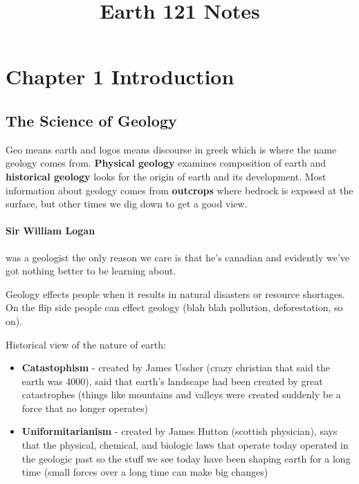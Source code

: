 \documentclass{article}
\title{Earth 121 Notes}
\author{}
\date{ }
\begin{document}
\maketitle

\tableofcontents


\section{Chapter 1 Introduction} %
\label{sec:chapter_1}
\subsection{The Science of Geology} %
\label{sub:the_science_of_geology}
Geo means earth and logos means discourse in greek which is where the name geology comes from. \textbf{Physical geology} examines composition of earth and \textbf{historical geology} looks for the origin of earth and its development. Most information about geology comes from \textbf{outcrops} where bedrock is exposed at the surface, but other times we dig down to get a good view.

\paragraph{Sir William Logan} was a geologist the only reason we care is that he's canadian and evidently we've got nothing better to be learning about.

Geology effects people when it results in natural disasters or resource shortages. On the flip side people can effect geology (blah blah pollution, deforestation, so on).

Historical view of the nature of earth:
\begin{itemize}
    \item \textbf{Catastophism} - created by James Ussher (crazy christian that said the earth was 4000), said that earth's landscape had been created by great catastrophes (things like mountains and valleys were created suddenly be a force that no longer operates)
    \item \textbf{Uniformitarianism} - created by James Hutton (scottish physician), says that the physical, chemical, and biologic laws that operate today operated in the geologic past so the stuff we see today have been shaping earth for a long time (small forces over a long time can make big changes)
\end{itemize}
\end{document}
